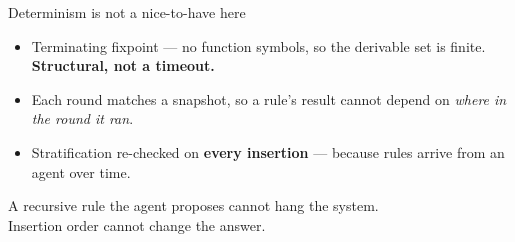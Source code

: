 \documentclass[aspectratio=169,11pt]{beamer}
\begin{document}
\begin{frame}{Determinism is not a nice-to-have here}
  \vspace{1em}
  \begin{itemize}
    \setlength\itemsep{.8em}
    \item Terminating fixpoint --- no function symbols, so the derivable set is
      finite. \textbf{Structural, not a timeout.}
    \item Each round matches a snapshot, so a rule's result cannot depend on
      \emph{where in the round it ran}.
    \item Stratification re-checked on \textbf{every insertion} --- because
      rules arrive from an agent over time.
  \end{itemize}
  \vspace{1.4em}
  \pause
  \begin{center}\color{muted}
    A recursive rule the agent proposes cannot hang the system.\\
    Insertion order cannot change the answer.
  \end{center}
\end{frame}
\end{document}
